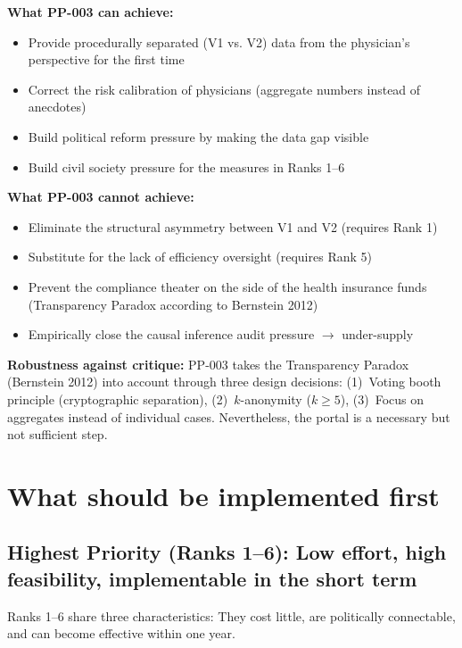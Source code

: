 \documentclass{umbruch-position}
\begin{document}
\textbf{What PP-003 can achieve:}
\begin{itemize}
  \item Provide procedurally separated (V1 vs. V2) data from the physician's perspective for the first time
  \item Correct the risk calibration of physicians (aggregate numbers instead of anecdotes)
  \item Build political reform pressure by making the data gap visible
  \item Build civil society pressure for the measures in Ranks 1--6
\end{itemize}

\textbf{What PP-003 cannot achieve:}
\begin{itemize}
  \item Eliminate the structural asymmetry between V1 and V2 (requires Rank 1)
  \item Substitute for the lack of efficiency oversight (requires Rank 5)
  \item Prevent the compliance theater on the side of the health insurance funds (Transparency Paradox according to Bernstein 2012)
  \item Empirically close the causal inference audit pressure $\to$ under-supply
\end{itemize}

\textbf{Robustness against critique:} PP-003 takes the Transparency Paradox (Bernstein 2012) into account through three design decisions: (1)~Voting booth principle (cryptographic separation), (2)~$k$-anonymity ($k\geq5$), (3)~Focus on aggregates instead of individual cases. Nevertheless, the portal is a necessary but not sufficient step.

\section{What should be implemented first}

\subsection*{Highest Priority (Ranks 1--6): Low effort, high feasibility, implementable in the short term}

Ranks 1--6 share three characteristics: They cost little, are politically connectable, and can become effective within one year.
\end{document}
